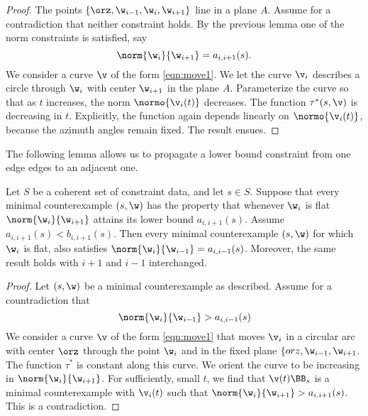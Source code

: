\begin{proof}  The points $\{\orz,\w_{i-1},\w_i,\w_{i+1}\}$ line in a plane $A$.
Assume for a contradiction that neither constraint holds.  By the previous
lemma one of the norm constraints is satisfied, say
\[
\norm{\w_i}{\w_{i+1}}=a_{i,i+1}(s).
\]
We consider a  curve $\v$ of the form \eqref{eqn:move1}.
We let the curve $\v_i$ describes a circle through
 $\w_i$ with center $\w_{i+1}$ in the plane $A$.  Parameterize the curve
so that as $t$ increases, the norm $\normo{\v_i(t)}$ decreases.
The function $\tau^*(s,\v)$ is decreasing in $t$.  Explicitly, the
function again depends linearly on $\normo{\v_i(t)}$, because
the azimuth angles remain fixed.  The result ensues.
\end{proof}

The following lemma allows us to propagate a lower bound constraint
from one edge edges to an adjacent one.

\begin{lemma} 
Let $S$ be a coherent set of constraint data, and let $s\in S$.
Suppose that every minimal counterexample $(s,\w)$ has the
property that whenever $\w_i$ is flat $\norm{\w_i}{\w_{i+1}}$ attains its
lower bound $a_{i,i+1}(s)$.   Assume $a_{i,i+1}(s)<b_{i,i+1}(s)$.
Then every minimal counterexample $(s,\w)$
for which $\w_i$ is flat, also satisfies $\norm{\w_i}{\w_{i-1}}=a_{i,i-1}(s)$.
Moreover, the same result holds with $i+1$ and $i-1$ interchanged.
\end{lemma}

\begin{proof}
Let $(s,\w)$ be a minimal counterexample as described.
Assume for a countradiction that 
\[
\norm{\w_i}{\w_{i-1}}>a_{i,i-1}(s)
\]
We consider a curve $\v$ of the form \eqref{eqn:move1} that moves $\v_i$
in a circular arc with center $\orz$ through the point $\w_i$ and in
the fixed plane $\{orz,\w_{i-1},\w_{i+1}$.  The function $\tau^*$ is
constant along this curve.  We orient the curve to be increasing
in $\norm{\w_i}{\w_{i+1}}$.  For sufficiently, small $t$, we find that
$\v(t)\BB_s$ is a minimal counterexample with $\v_i(t)$ such that
$\norm{\w_i}{\w_{i+1}} > a_{i,i+1}(s)$. This is a contradiction.
\end{proof}

